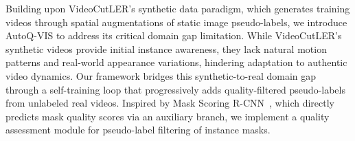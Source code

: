 Building upon VideoCutLER's synthetic data paradigm, which generates training videos through spatial augmentations of static image pseudo-labels, we introduce AutoQ-VIS to address its critical domain gap limitation. While VideoCutLER's synthetic videos provide initial instance awareness, they lack natural motion patterns and real-world appearance variations, hindering adaptation to authentic video dynamics. Our framework bridges this synthetic-to-real domain gap through a self-training loop that progressively adds quality-filtered pseudo-labels from unlabeled real videos. Inspired by Mask Scoring R-CNN~\cite{maskscore}, which directly predicts mask quality scores via an auxiliary branch, we implement a quality assessment module for pseudo-label filtering of instance masks.



